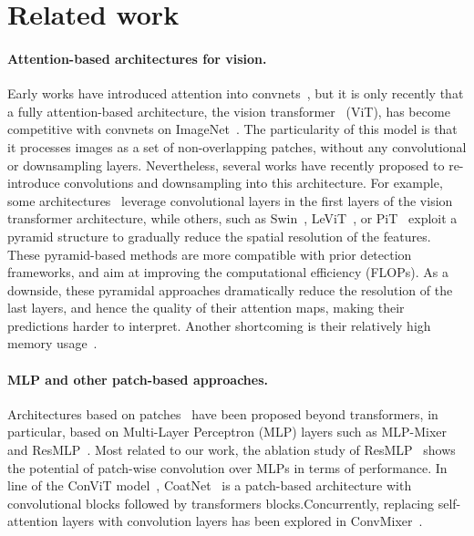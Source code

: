 \section{Related work}


\paragraph{Attention-based architectures for vision.} 
Early works have introduced attention into convnets~\cite{Bello2019AttentionAC,Ramachandran2019StandAloneSI,Shen2020GlobalSN,Wang2018NonlocalNN,Wu2020VisualTT},  
%
but it is only recently that a fully attention-based architecture, the vision transformer~\cite{dosovitskiy2020image} (ViT), has become competitive with convnets on ImageNet~\cite{dosovitskiy2020image,Touvron2020TrainingDI}. 
The particularity of this model is that it processes images as a set of non-overlapping patches, without any convolutional or downsampling layers. 
Nevertheless, several works have recently proposed to re-introduce convolutions and downsampling into this architecture. 
% 
For example, some architectures~\cite{graham2021levit,Xiao2021EarlyCH} leverage convolutional layers in the first layers of the vision transformer architecture, while others, such as Swin~\cite{liu2021swin}, LeViT~\cite{graham2021levit}, or PiT~\cite{Heo2021RethinkingSD} exploit a pyramid structure to gradually reduce the spatial resolution of the features. 
These pyramid-based methods are more compatible with prior detection frameworks, and aim at improving the computational efficiency (FLOPs). 
As a downside, these pyramidal approaches dramatically reduce the resolution of the last layers, and hence the quality of their attention maps, making their predictions harder to interpret. Another shortcoming is their relatively high memory usage~\cite{sandler2019nondiscriminative}. 

%



\paragraph{MLP and other patch-based approaches.} 
Architectures based on patches~\cite{liu2021ready}  have been proposed beyond transformers, in particular, based on Multi-Layer Perceptron (MLP) layers such as MLP-Mixer~\cite{tolstikhin2021MLPMixer} and ResMLP~\cite{Touvron2021ResMLPFN}.
%
Most related to our work, the ablation study of ResMLP~\cite{Touvron2021ResMLPFN} shows the potential of patch-wise convolution over MLPs in terms of performance. 
%
In line of the ConViT model~\cite{dAscoli2021ConViTIV}, CoatNet~\cite{Dai2021CoAtNetMC} is a patch-based architecture with convolutional blocks followed by transformers blocks.Concurrently, replacing self-attention layers with convolution layers has been explored in ConvMixer~\cite{anonymous2022patches}.

